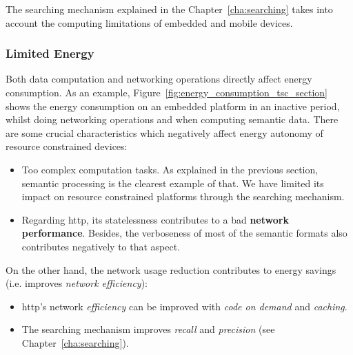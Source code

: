 The searching mechanism explained in the Chapter~\ref{cha:searching} takes into account the computing limitations of embedded and mobile devices.



\subsubsection{Limited Energy}

Both data computation and networking operations directly affect energy consumption.
As an example, Figure~\ref{fig:energy_consumption_tsc_section} shows the energy consumption on an embedded platform in an inactive period, whilst doing networking operations and when computing semantic data. %
There are some crucial characteristics which negatively affect energy autonomy of resource constrained devices:
\begin{itemize}
  \item Too complex computation tasks.
        As explained in the previous section, semantic processing is the clearest example of that.
        We have limited its impact on resource constrained platforms through the searching mechanism.
  \item Regarding \ac{http}, its statelessness contributes to a bad \textbf{network performance}.
        Besides, the verboseness of most of the semantic formats also contributes negatively to that aspect.
\end{itemize}




On the other hand, the network usage reduction contributes to energy savings (i.e. improves \emph{network efficiency}):
\begin{itemize}
  \item \ac{http}'s network \emph{efficiency} can be improved with \emph{code on demand} and \emph{caching}.
  \item The searching mechanism improves \emph{recall} and \emph{precision} (see Chapter~\ref{cha:searching}).
\end{itemize}





